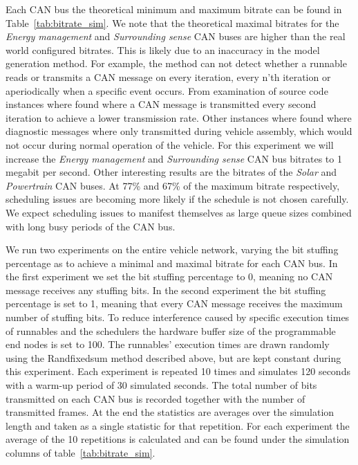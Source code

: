 Each CAN bus the theoretical minimum and maximum bitrate can be found in Table~\ref{tab:bitrate_sim}. We note that the theoretical maximal bitrates for the \textit{Energy management} and \textit{Surrounding sense} CAN buses are higher than the real world configured bitrates. This is likely due to an inaccuracy in the model generation method. For example, the method can not detect whether a runnable reads or transmits a CAN message on every iteration, every n'th iteration or aperiodically when a specific event occurs. From examination of source code instances where found where a CAN message is transmitted every second iteration to achieve a lower transmission rate. Other instances where found where diagnostic messages where only transmitted during vehicle assembly, which would not occur during normal operation of the vehicle. For this experiment we will increase the \textit{Energy management} and \textit{Surrounding sense} CAN bus bitrates to 1 megabit per second. Other interesting results are the bitrates of the \textit{Solar} and \textit{Powertrain} CAN buses. At 77\% and 67\% of the maximum bitrate respectively, scheduling issues are becoming more likely if the schedule is not chosen carefully. We expect scheduling issues to manifest themselves as large queue sizes combined with long busy periods of the CAN bus.

We run two experiments on the entire vehicle network, varying the bit stuffing percentage as to achieve a minimal and maximal bitrate for each CAN bus. In the first experiment we set the bit stuffing percentage to 0, meaning no CAN message receives any stuffing bits. In the second experiment the bit stuffing percentage is set to 1, meaning that every CAN message receives the maximum number of stuffing bits. To reduce interference caused by specific execution times of runnables and the schedulers the hardware buffer size of the programmable end nodes is set to 100. The runnables' execution times are drawn randomly using the Randfixedsum method described above, but are kept constant during this experiment. Each experiment is repeated 10 times and simulates 120 seconds with a warm-up period of 30 simulated seconds. The total number of bits transmitted on each CAN bus is recorded together with the number of transmitted frames. At the end the statistics are averages over the simulation length and taken as a single statistic for that repetition. For each experiment the average of the 10 repetitions is calculated and can be found under the simulation columns of table~\ref{tab:bitrate_sim}.

